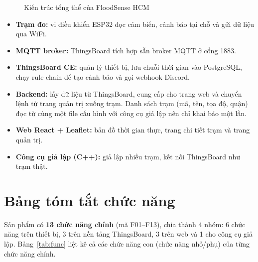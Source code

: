 \documentclass[12pt,a4paper]{article}
\begin{document}
\begin{figure}[H]
\centering
\resizebox{\linewidth}{!}{\FigArchitecture}
\caption{Kiến trúc tổng thể của FloodSense HCM}
\label{fig:arch}
\end{figure}

\begin{itemize}
  \item \textbf{Trạm đo:} vi điều khiển ESP32 đọc cảm biến, cảnh báo tại chỗ và gửi dữ liệu qua WiFi.
  \item \textbf{MQTT broker:} ThingsBoard tích hợp sẵn broker MQTT ở cổng 1883.
  \item \textbf{ThingsBoard CE:} quản lý thiết bị, lưu chuỗi thời gian vào PostgreSQL, chạy rule chain để tạo cảnh báo và gọi webhook Discord.
  \item \textbf{Backend:} lấy dữ liệu từ ThingsBoard, cung cấp cho trang web và chuyển lệnh từ trang quản trị xuống trạm. Danh sách trạm (mã, tên, tọa độ, quận) đọc từ cùng một file cấu hình với công cụ giả lập nên chỉ khai báo một lần.
  \item \textbf{Web React + Leaflet:} bản đồ thời gian thực, trang chi tiết trạm và trang quản trị.
  \item \textbf{Công cụ giả lập (C++):} giả lập nhiều trạm, kết nối ThingsBoard như trạm thật.
\end{itemize}

\section{Bảng tóm tắt chức năng}

Sản phẩm có \textbf{13 chức năng chính} (mã F01--F13), chia thành 4 nhóm: 6 chức năng trên thiết bị, 3 trên nền tảng ThingsBoard, 3 trên web và 1 cho công cụ giả lập. Bảng~\ref{tab:func} liệt kê cả các chức năng con (chức năng nhỏ/phụ) của từng chức năng chính.
\end{document}

